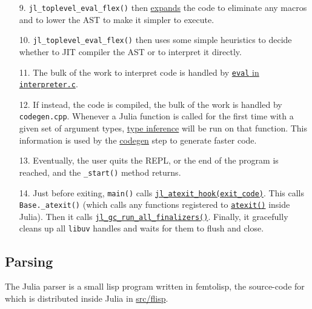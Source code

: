 \begin{itemize}
\item[9.  ] \texttt{jl\_toplevel\_eval\_flex()} then \hyperlink{16669853702383402486}{expands} the code to eliminate any macros and to {\textquotedbl}lower{\textquotedbl} the AST to make it simpler to execute.


\item[10. ] \texttt{jl\_toplevel\_eval\_flex()} then uses some simple heuristics to decide whether to JIT compiler the  AST or to interpret it directly.


\item[11. ] The bulk of the work to interpret code is handled by \href{https://github.com/JuliaLang/julia/blob/master/src/interpreter.c}{\texttt{eval} in \texttt{interpreter.c}}.


\item[12. ] If instead, the code is compiled, the bulk of the work is handled by \texttt{codegen.cpp}. Whenever a  Julia function is called for the first time with a given set of argument types, \hyperlink{6510123671388929580}{type inference}  will be run on that function. This information is used by the \hyperlink{526576549562645049}{codegen} step to generate  faster code.


\item[13. ] Eventually, the user quits the REPL, or the end of the program is reached, and the \texttt{\_start()}  method returns.


\item[14. ] Just before exiting, \texttt{main()} calls \href{https://github.com/JuliaLang/julia/blob/master/src/init.c}{\texttt{jl\_atexit\_hook(exit\_code)}}.  This calls \texttt{Base.\_atexit()} (which calls any functions registered to \hyperlink{17479944696971324992}{\texttt{atexit()}} inside  Julia). Then it calls \href{https://github.com/JuliaLang/julia/blob/master/src/gc.c}{\texttt{jl\_gc\_run\_all\_finalizers()}}.  Finally, it gracefully cleans up all \texttt{libuv} handles and waits for them to flush and close.

\end{itemize}


\hypertarget{6801832859572424777}{}


\subsection{Parsing}



The Julia parser is a small lisp program written in femtolisp, the source-code for which is distributed inside Julia in \href{https://github.com/JuliaLang/julia/tree/master/src/flisp}{src/flisp}.



